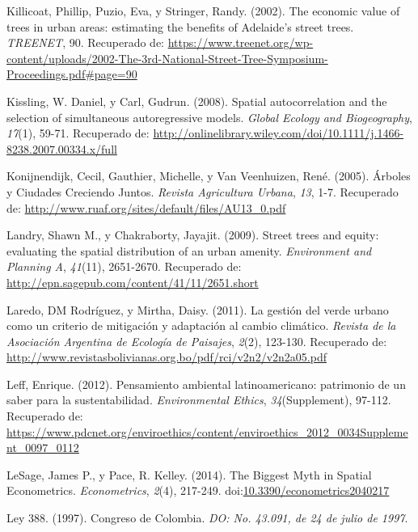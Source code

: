 \documentclass[12pt,a4paper,openany]{book}
\theoremstyle{definition}
\theoremstyle{definition}
\theoremstyle{definition}
\theoremstyle{remark}
\begin{document}
\hypertarget{ref-killicoat_economic_2002}{}
Killicoat, Phillip, Puzio, Eva, y Stringer, Randy. (2002). The economic
value of trees in urban areas: estimating the benefits of Adelaide's
street trees. \emph{TREENET}, 90. Recuperado de:
\url{https://www.treenet.org/wp-content/uploads/2002-The-3rd-National-Street-Tree-Symposium-Proceedings.pdf\#page=90}

\hypertarget{ref-kissling_spatial_2008}{}
Kissling, W. Daniel, y Carl, Gudrun. (2008). Spatial autocorrelation and
the selection of simultaneous autoregressive models. \emph{Global
Ecology and Biogeography}, \emph{17}(1), 59-71. Recuperado de:
\url{http://onlinelibrary.wiley.com/doi/10.1111/j.1466-8238.2007.00334.x/full}

\hypertarget{ref-konijnendijk_arboles_2005}{}
Konijnendijk, Cecil, Gauthier, Michelle, y Van Veenhuizen, René. (2005).
Árboles y Ciudades Creciendo Juntos. \emph{Revista Agricultura Urbana},
\emph{13}, 1-7. Recuperado de:
\url{http://www.ruaf.org/sites/default/files/AU13_0.pdf}

\hypertarget{ref-landry_street_2009}{}
Landry, Shawn M., y Chakraborty, Jayajit. (2009). Street trees and
equity: evaluating the spatial distribution of an urban amenity.
\emph{Environment and Planning A}, \emph{41}(11), 2651-2670. Recuperado
de: \url{http://epn.sagepub.com/content/41/11/2651.short}

\hypertarget{ref-laredo_gestion_2011}{}
Laredo, DM Rodríguez, y Mirtha, Daisy. (2011). La gestión del verde
urbano como un criterio de mitigación y adaptación al cambio climático.
\emph{Revista de la Asociación Argentina de Ecología de Paisajes},
\emph{2}(2), 123-130. Recuperado de:
\url{http://www.revistasbolivianas.org.bo/pdf/rci/v2n2/v2n2a05.pdf}

\hypertarget{ref-leff_pensamiento_2012}{}
Leff, Enrique. (2012). Pensamiento ambiental latinoamericano: patrimonio
de un saber para la sustentabilidad. \emph{Environmental Ethics},
\emph{34}(Supplement), 97-112. Recuperado de:
\url{https://www.pdcnet.org/enviroethics/content/enviroethics_2012_0034Supplement_0097_0112}

\hypertarget{ref-lesage_biggest_2014}{}
LeSage, James P., y Pace, R. Kelley. (2014). The Biggest Myth in Spatial
Econometrics. \emph{Econometrics}, \emph{2}(4), 217-249.
doi:\href{https://doi.org/10.3390/econometrics2040217}{10.3390/econometrics2040217}

\hypertarget{ref-ley388col}{}
Ley 388. (1997). Congreso de Colombia. \emph{DO: No. 43.091, de 24 de
julio de 1997}.
\end{document}
